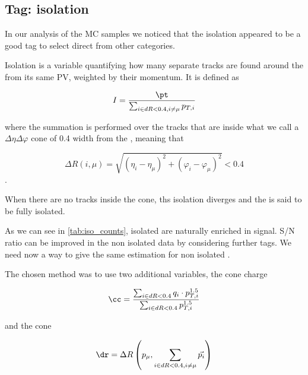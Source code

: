 \subsection{Tag: isolation}
\label{subsec:tag_iso}

In our analysis of the MC samples we noticed that the isolation appeared to be a good tag to select direct \Pgm from other \Pgm categories.

Isolation is a variable quantifying how many separate tracks are found around the \Pgm from its same PV, weighted by their momentum.
It is defined as 

\begin{equation}
	I=\frac{\pt}{\sum_{i\in dR<0.4,i\neq\mu} p_{T,i}}
	\label{eq:inv_iso}
\end{equation}

where the summation is performed over the tracks that are inside what we call a $\Delta\eta\Delta\varphi$ cone of 0.4 width from the \Pgm, meaning that 

$$\Delta R\left(i, \mu\right) = \sqrt{\left(\eta_i-\eta_\mu\right)^2+\left(\varphi_i-\varphi_\mu\right)^2} < 0.4$$.

When there are no tracks inside the cone, ths isolation diverges and the \Pgm is said to be fully isolated.

As we can see in \autoref{tab:iso_counts}, isolated \Pgm are naturally enriched in signal. S/N ratio can be improved in the non isolated data by considering further tags.
We need now a way to give the same estimation for non isolated \Pgm.


The chosen method was to use two additional variables, the cone charge \cc

\begin{equation}
	\cc=\frac{\sum_{i\in dR<0.4} q_i\cdot p_{T,i}^{1.5}}{\sum_{i\in dR<0.4} p_{T,i}^{1.5}}
	\label{eq:cone_cha}
\end{equation}

and the cone \dr

\begin{equation}
	\dr=\Delta R\left(p_\mu,\sum_{i\in dR<0.4,i\neq\mu}\vec{p_i}\right)
	\label{eq:cone_dr}
\end{equation}

